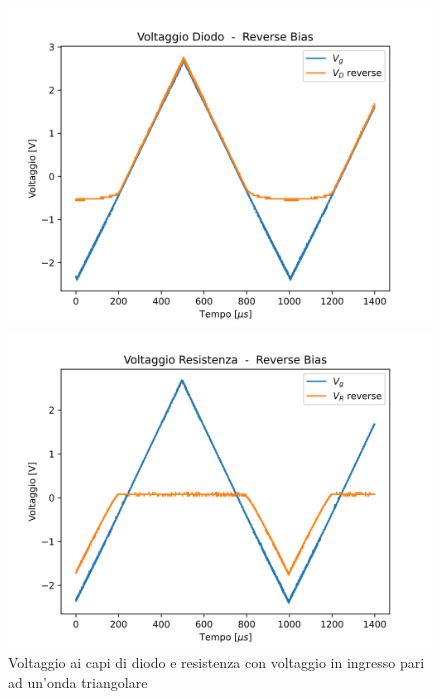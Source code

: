 \begin{figure}
\begin{minipage}{0.475\textwidth}
    \end{minipage}
    \begin{minipage}{0.475\textwidth}
        \includegraphics[width=1\textwidth]{Diodo 3.2.3/Triang_V_D_Reverse.png}
    \end{minipage}
    \hfill
    \begin{minipage}{0.475\textwidth}
        \includegraphics[width=1\textwidth]{Diodo 3.2.3/Triang_V_R_Reverse.png}
    \end{minipage}
    \caption{Voltaggio ai capi di diodo e resistenza con voltaggio in ingresso pari ad un'onda triangolare }
    \label{fig:enter-label}
\end{figure}

